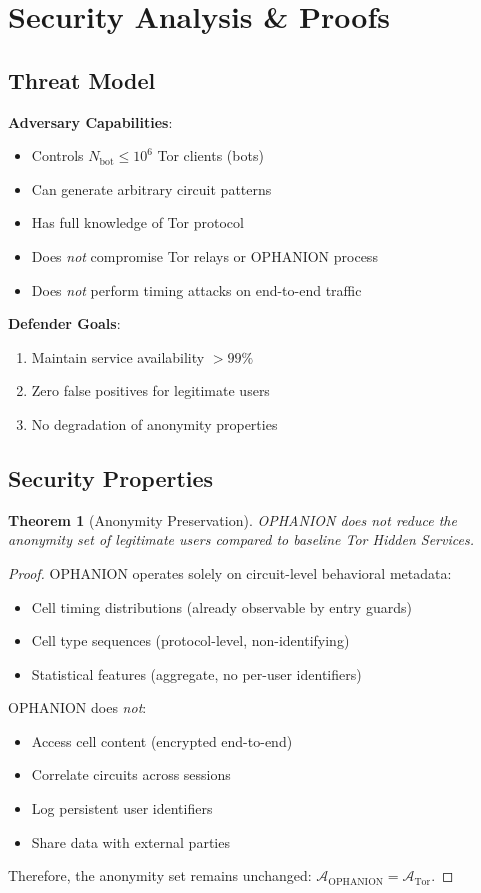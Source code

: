 \documentclass[11pt,a4paper]{article}
\newtheorem{theorem}{Theorem}[section]
\begin{document}
\newpage
\section{Security Analysis \& Proofs}

\subsection{Threat Model}

\textbf{Adversary Capabilities}:
\begin{itemize}
\item Controls $N_{\text{bot}} \leq 10^6$ Tor clients (bots)
\item Can generate arbitrary circuit patterns
\item Has full knowledge of Tor protocol
\item Does \textit{not} compromise Tor relays or OPHANION process
\item Does \textit{not} perform timing attacks on end-to-end traffic
\end{itemize}

\textbf{Defender Goals}:
\begin{enumerate}
\item Maintain service availability $> 99\%$
\item Zero false positives for legitimate users
\item No degradation of anonymity properties
\end{enumerate}

\subsection{Security Properties}

\begin{theorem}[Anonymity Preservation]
OPHANION does not reduce the anonymity set of legitimate users compared to baseline Tor Hidden Services.
\end{theorem}

\begin{proof}
OPHANION operates solely on circuit-level behavioral metadata:
\begin{itemize}
\item Cell timing distributions (already observable by entry guards)
\item Cell type sequences (protocol-level, non-identifying)
\item Statistical features (aggregate, no per-user identifiers)
\end{itemize}

OPHANION does \textit{not}:
\begin{itemize}
\item Access cell content (encrypted end-to-end)
\item Correlate circuits across sessions
\item Log persistent user identifiers
\item Share data with external parties
\end{itemize}

Therefore, the anonymity set remains unchanged: $\mathcal{A}_{\text{OPHANION}} = \mathcal{A}_{\text{Tor}}$.
\end{proof}
\end{document}
